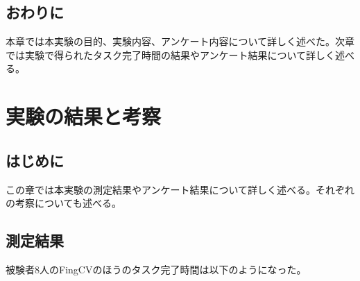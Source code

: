 \documentclass[11pt,a4j, titlepage]{jarticle} %
\begin{document}
\subsection{おわりに}
本章では本実験の目的、実験内容、アンケート内容について詳しく述べた。次章では実験で得られたタスク完了時間の結果やアンケート結果について詳しく述べる。

\newpage
\section{実験の結果と考察}
\subsection{はじめに}
この章では本実験の測定結果やアンケート結果について詳しく述べる。それぞれの考察についても述べる。

\subsection{測定結果}
被験者8人のFingCVのほうのタスク完了時間は以下のようになった。
\end{document}
